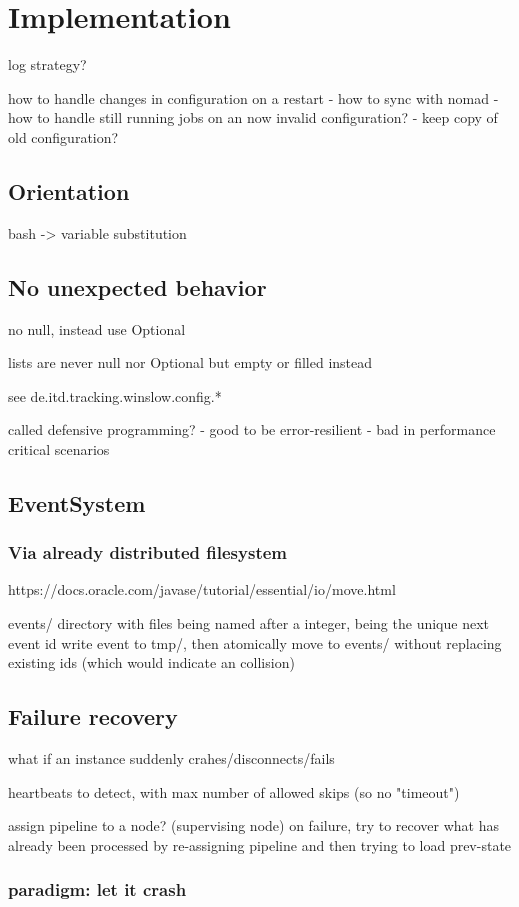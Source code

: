 \chapter{Implementation}

log strategy?

how to handle changes in configuration on a restart
 - how to sync with nomad
 - how to handle still running jobs on an now invalid configuration?
    - keep copy of old configuration?

\section{Orientation}

bash -> variable substitution

\section{No unexpected behavior}

no null, instead use Optional

lists are never null nor Optional but empty or filled instead

see de.itd.tracking.winslow.config.*

called defensive programming?
  - good to be error-resilient
  - bad in performance critical scenarios
  
\section{EventSystem}

\subsection{Via already distributed filesystem}

https://docs.oracle.com/javase/tutorial/essential/io/move.html

events/ directory with files being named after a integer, being the unique next event id
write event to tmp/, then atomically move to events/ without replacing existing ids (which would indicate an collision)

\section{Failure recovery}

what if an instance suddenly crahes/disconnects/fails

heartbeats to detect, with max number of allowed skips (so no "timeout")



assign pipeline to a node? (supervising node)
  on failure, try to recover what has already been processed
    by re-assigning pipeline and then trying to load prev-state
    
\subsection{paradigm: let it crash}